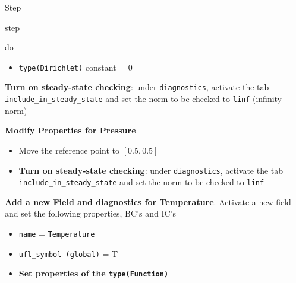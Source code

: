 \begin{steps}{Step}
\begin{steps}{step}
\begin{steps}{do}
\begin{itemize}
        \item \texttt{type(Dirichlet)} constant = 0
        \end{itemize}
    \item \textbf{Turn on steady-state checking}: under
      \texttt{diagnostics}, activate the tab
      \texttt{include\_in\_steady\_state} and set the norm to be
      checked to \texttt{linf} (infinity norm)
      \end{steps}
    \item \textbf{Modify Properties for Pressure}
      \begin{itemize}
      \item Move the reference point to $[0.5, 0.5]$
      \item \textbf{Turn on steady-state checking}:  under
      \texttt{diagnostics}, activate the tab
      \texttt{include\_in\_steady\_state} and set the norm to be
      checked to \texttt{linf}
      \end{itemize}
    \item \textbf{Add a new Field and diagnostics for Temperature}.
      Activate a new field and set the following properties, BC's and IC's
      \begin{itemize}
      \item \texttt{name} = \texttt{Temperature}
      \item \texttt{ufl\_symbol (global)} = T
      \item \textbf{Set properties of the \texttt{type(Function)}}
\end{itemize}
\end{steps}
\end{steps}
